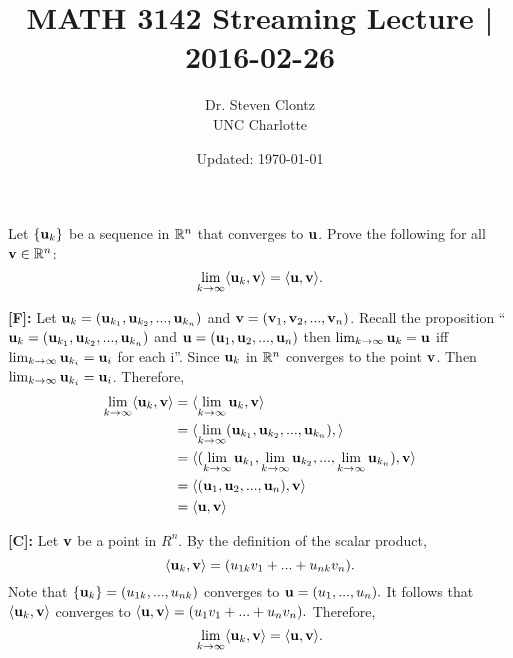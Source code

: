 \documentclass[letterpaper, twoside, 12pt]{book}
\title{MATH 3142 Streaming Lecture | 2016-02-26}
\date{Updated: \today}
\author{Dr. Steven Clontz\\ UNC Charlotte}
\begin{document}
\maketitle



\begin{exercise}[1]
  Let \(\{\mathbf u_k\}\) be a sequence in \(\mathbb R^n\) that converges to
  \(\mathbf u\). Prove the following for all \(\mathbf v\in\mathbb R^n\):
  \[\lim_{k\to\infty}\langle\mathbf u_k,\mathbf v\rangle=\langle\mathbf u,\mathbf v\rangle.\]
\end{exercise}

\bigskip

\begin{solution}\textbf{[F]:}
Let \(\mathbf u_k=(\mathbf u_{k_1},\mathbf u_{k_2},...,\mathbf u_{k_n})\) and \(\mathbf v=(\mathbf v_1,\mathbf v_2,...,\mathbf v_n)\). Recall the proposition ``\(\mathbf u_k=(\mathbf u_{k_1},\mathbf u_{k_2},...,\mathbf u_{k_n})\) and \(\mathbf u=(\mathbf u_1,\mathbf u_2,...,\mathbf u_n)\) then \(\lim_{k\to\infty}\mathbf u_k=\mathbf u\) iff\(\lim_{k\to\infty}\mathbf u_{k_i}=\mathbf u_i\) for each i''. Since \({\mathbf u_k}\) in \(\mathbb R^n\) converges to the point \(\mathbf v\). Then \(\lim_{k\to\infty}\mathbf u_{k_i}=\mathbf u_i\). Therefore,
\begin{align*}
      \lim_{k\to\infty}\langle\mathbf u_k,\mathbf v\rangle &= \langle\lim_{k\to\infty}\mathbf u_k,\mathbf v\rangle\\
      &= \langle\lim_{k\to\infty}(\mathbf u_{k_1},\mathbf u_{k_2},...,\mathbf u_{k_n}),\mathbf{\rangle}\\
      &= \langle(\lim_{k\to\infty}\mathbf u_{k_1},\lim_{k\to\infty}\mathbf u_{k_2},...,\lim_{k\to\infty}\mathbf u_{k_n}),\mathbf v\rangle\\
      &= \langle(\mathbf u_1,\mathbf u_2,...,\mathbf u_n),\mathbf v\rangle\\
      &= \langle\mathbf u,\mathbf v\rangle\\
\end{align*}
\end{solution}

\bigskip

\begin{solution} \textbf{[C]:}
Let \(\mathbf v\) be a point in \(R^n.\) By the definition of the scalar product, \[\langle\mathbf u_k,\mathbf v\rangle=(u_{1k}v_1+...+u_{nk}v_n).\] Note that \(\{\mathbf u_k\}=(u_{1k},...,u_{nk})\) converges to \(\mathbf u=(u_1,...,u_n).\) It follows that \(\langle\mathbf u_k,\mathbf v\rangle\) converges to \(\langle\mathbf u,\mathbf v\rangle=(u_1v_1+...+u_nv_n).\) Therefore, \[\lim_{k\to\infty}\langle\mathbf u_k,\mathbf v\rangle=\langle\mathbf u,\mathbf v\rangle.\]
\end{solution}
\end{document}
